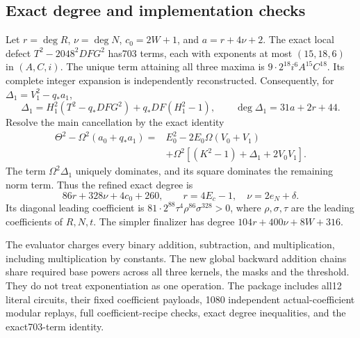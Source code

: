 \subsection{Exact degree and implementation checks}
Let $r=\deg R$, $\nu=\deg N$, $c_0=2W+1$, and $a=r+4\nu+2$.
The exact local defect $T^2-2048^2DFG^2$ has703 terms, each with exponents
at most $(15,18,6)$ in $(A,C,i)$.  The unique term attaining all three
maxima is $9\cdot2^{18}i^6A^{15}C^{18}$.  Its complete integer expansion
is independently reconstructed.  Consequently, for
$\Delta_1=V_1^2-q_*a_1$,
\[
 \Delta_1=H_1^2(T^2-q_*DFG^2)+q_*DF(H_1^2-1),\qquad
 \deg\Delta_1=31a+2r+44.
\]
Resolve the main cancellation by the exact identity
{\small
\begin{align*}
 \Theta^2-\Omega^2(a_0+q_*a_1)
 ={}&E_0^2-2E_0\Omega(V_0+V_1)\\
 &+\Omega^2[(K^2-1)+\Delta_1+2V_0V_1].
\end{align*}
}
The term $\Omega^2\Delta_1$ uniquely dominates, and its square dominates
the remaining norm term.  Thus the refined exact degree is
\[
 \boxed{86r+328\nu+4c_0+260},\qquad
 r=4E_c-1,\quad\nu=2e_N+\delta.
\]
Its diagonal leading coefficient is
$81\cdot2^{88}\tau^4\rho^{86}\sigma^{328}>0$, where
$\rho,\sigma,\tau$ are the leading coefficients of $R,N,t$.
The simpler finalizer has degree $104r+400\nu+8W+316$.

The evaluator charges every binary addition, subtraction, and multiplication,
including multiplication by constants.  The new global backward addition
chains share required base powers across all three kernels, the masks and
the threshold.  They do not treat exponentiation as one operation.
The package includes all12 literal circuits, their fixed coefficient payloads,
1080 independent actual-coefficient modular replays, full coefficient-recipe
checks, exact degree inequalities, and the exact703-term identity.
